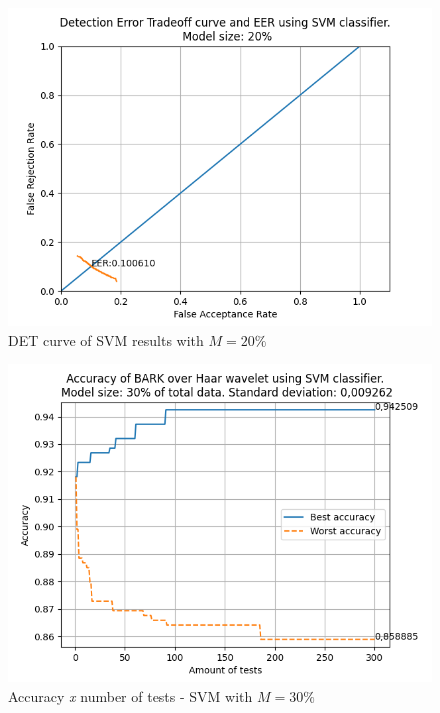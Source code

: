 \begin{figure}[H]
\centering
\includegraphics[scale=.6]{images/results/det/DET_SVM_20}
\caption{DET curve of SVM results with $M=20\%$}
\label{fig:detsvm20}
\end{figure}
\begin{figure}[H]
\centering
\includegraphics[scale=.6]{images/results/confusionMatrices/classifier_SVM_30.png}
\caption{Accuracy \textit{x} number of tests - SVM with $M=30\%$}
\label{fig:classifiersvm30}
\end{figure}
